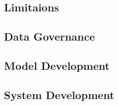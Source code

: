 \subsection{Limitaions}


\subsection{Data Governance}


\subsection{Model Development}


\subsection{System Development}
